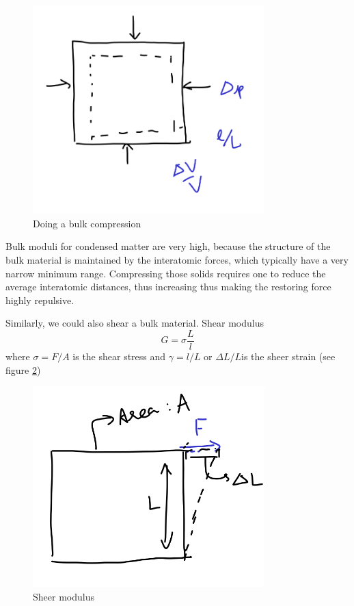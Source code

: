 \documentclass[a4paper]{article}
\begin{document}
\begin{figure}[h]
	\centering
	\includegraphics[width=0.8\textwidth]{figures/bulkmod.png}
	\caption{Doing a bulk compression}
	\label{fig:figures-bulkmod-png}
\end{figure}
Bulk moduli for condensed matter are very high, because the structure
of the bulk material is maintained by the interatomic forces, which
typically have a very narrow minimum range. Compressing those solids
requires one to reduce the average interatomic distances, thus increasing
thus making the restoring force highly repulsive.

Similarly, we could also shear a bulk material. Shear modulus
\begin{equation}
	G = \sigma \frac{L}{l}
\end{equation}
where $\sigma = F/A$ is the shear stress and $\gamma = l/L$ or $\Delta L / L$is the
sheer strain (see figure \ref{fig:sheer})

\begin{figure}[h]
	\centering
	\includegraphics[width=0.8\textwidth]{figures/sheer.png}
	\caption{Sheer modulus}
	\label{fig:sheer}
\end{figure}
\end{document}
